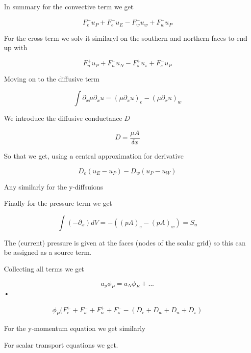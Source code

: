 \documentclass{article}
\begin{document}
In summary for the convective term we get

\begin{equation}
F_e^+ u_P + F_e^- u_E -  F_w^+ u_w + F_w^- u_P
\end{equation}

For the cross term we solv it similaryl on the southern and northern faces to end up with

\begin{equation}
F_n^+ u_P + F_n^- u_N -  F_s^+ u_s + F_s^- u_P
\end{equation}

Moving on to the diffusive term

\begin{equation}
\int \partial_x \mu \partial_x u = (\mu \partial_x u)_e - (\mu \partial_x u)_w
\end{equation}

We introduce the diffusive conductance $D$

\begin{equation}
D = \frac{\mu A}{\delta x}
\end{equation}

So that we get, using a central approximation for derivative

\begin{equation}
D_e (u_E - u_P) - D_w (u_P - u_W)
\end{equation}

Any similarly for the y-diffsuions

Finally for the pressure term we get

\begin{equation}
\int (-\partial_x) dV = -((pA)_e -(pA)_w) = S_u
\end{equation}

The (current) pressure is given at the faces (nodes of the scalar grid) so this can be assigned as a source term.

Collecting all terms we get

\begin{equation}
a_p \phi_P = a_N \phi_E + ...
\end{equation}•

\begin{align}
\phi_P (F_e^+ + F_w^- + F_n^+ + F_s^- - (D_e +D_w +D_n +D_s)
\end{align}

For the y-momentum equation we get similarly

For scalar transport equations we get.
\end{document}
